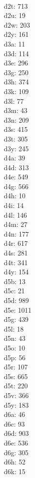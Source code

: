 \begin{multicols}{8}
  \\d2t: 713
  \\d2u: 19
  \\d2w: 203
  \\d2y: 161
  \\d3a: 11
  \\d3d: 114
  \\d3e: 296
  \\d3g: 250
  \\d3h: 374
  \\d3k: 109
  \\d3l: 77
  \\d3m: 43
  \\d3n: 209
  \\d3s: 415
  \\d3t: 305
  \\d3y: 245
  \\d4a: 39
  \\d4d: 313
  \\d4e: 549
  \\d4g: 566
  \\d4h: 10
  \\d4i: 14
  \\d4l: 146
  \\d4m: 27
  \\d4n: 177
  \\d4r: 617
  \\d4s: 281
  \\d4t: 341
  \\d4y: 154
  \\d5b: 13
  \\d5c: 21
  \\d5d: 989
  \\d5e: 1011
  \\d5g: 439
  \\d5l: 18
  \\d5n: 43
  \\d5o: 10
  \\d5p: 56
  \\d5r: 107
  \\d5s: 665
  \\d5t: 220
  \\d5v: 366
  \\d5y: 183
  \\d6a: 46
  \\d6c: 93
  \\d6d: 903
  \\d6e: 536
  \\d6g: 305
  \\d6h: 52
  \\d6k: 15

\end{multicols}
